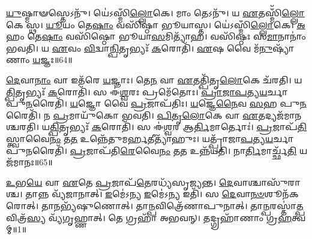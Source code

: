 \-\ul{𑌯𑍁}\-𑌷𑍍𑌮𑌾𑍟𑌸𑍍𑌤𑍇𑌽𑌨𑍁᳴।
𑌯𑍇॑𑌽𑌸𑍍𑌮𑌿𑌁\-\ul{𑌲𑍍𑌲𑍋}\-𑌕𑍇।
𑌮𑌾𑌂 𑌤𑍇𑌽𑌨𑍁᳴।
𑌯 \ul{𑌏}\-𑌤𑌸𑍍𑌮𑌿𑌁᳴\-\ul{𑌲𑍍𑌲𑍋}\-𑌕𑍇 𑌸𑍍𑌥।
\-\ul{𑌯𑍂}\-𑌯𑌂 𑌤𑍇\-\ul{𑌷𑌾𑌂} 𑌵𑌸𑌿᳴𑌷𑍍𑌠𑌾 𑌭𑍂𑌯𑌾𑌸𑍍𑌤।
𑌯𑍇॑𑌽𑌸𑍍𑌮𑌿𑌁\-\ul{𑌲𑍍𑌲𑍋}\-𑌕𑍇।
\-\ul{𑌅}\-𑌹𑌂 𑌤𑍇\-\ul{𑌷𑌾𑌂} 𑌵𑌸𑌿᳴𑌷𑍍𑌠𑍋 𑌭𑍂𑌯𑌾\-\ul{𑌸}\-𑌮𑌿𑌤𑍍𑌯𑌾᳴𑌹।
𑌵𑌸𑌿᳴𑌷𑍍𑌠𑌃 𑌸\-\ul{𑌮𑌾}\-𑌨𑌾𑌨𑌾𑌂॑ 𑌭𑌵𑌤𑌿।
𑌯 \ul{𑌏}\-𑌵𑌂 \ul{𑌵𑌿}\-𑌦𑍍𑌵𑌾\-\ul{𑌨𑍍𑌪𑌿}\-𑌤𑍃𑌭𑍍𑌯𑌃᳴ \ul{𑌕}\-𑌰𑍋𑌤𑌿᳴।
\-\ul{𑌏}\-𑌷 𑌵𑍈 𑌮᳴\-\ul{𑌨𑍁}\-𑌷𑍍𑌯𑌾᳴𑌣𑌾𑌂 \ul{𑌯}\-𑌜𑍍𑌞𑌃॥64॥

\-\ul{𑌦𑍇}\-𑌵𑌾\-\ul{𑌨𑌾𑌂} 𑌵𑌾 𑌇𑌤᳴𑌰𑍇 \ul{𑌯}\-𑌜𑍍𑌞𑌾𑌃।
𑌤𑍇\-\ul{𑌨} 𑌵𑌾 \ul{𑌏}\-𑌤𑌤𑍍𑌪𑌿᳴𑌤𑍃\-\ul{𑌲𑍋}\-𑌕𑍇 𑌚᳴𑌰𑌤𑌿।
𑌯\-\ul{𑌤𑍍𑌪𑌿}\-𑌤𑍃𑌭𑍍𑌯𑌃᳴ \ul{𑌕}\-𑌰𑍋𑌤𑌿᳴।
𑌸 𑌈॑\-\ul{𑌶𑍍𑌵}\-𑌰𑌃 𑌪𑍍𑌰𑌮𑍇᳴𑌤𑍋𑌃।
\-\ul{𑌪𑍍𑌰𑌾}\-\-\ul{𑌜𑌾}\-\-\ul{𑌪}\-𑌤𑍍𑌯\-\ul{𑌯}\-𑌰𑍍𑌚𑌾 𑌪𑍁\-\ul{𑌨}\-𑌰𑍈𑌤𑌿᳴।
\-\ul{𑌯}\-𑌜𑍍𑌞𑍋 𑌵𑍈 \ul{𑌪𑍍𑌰}\-𑌜𑌾\-𑌪᳴𑌤𑌿𑌃।
\-\ul{𑌯}\-𑌜𑍍𑌞𑍇\-\ul{𑌨𑍈}\-𑌵 \ul{𑌸}\-𑌹 𑌪𑍁\-\ul{𑌨}\-𑌰𑍈𑌤𑌿᳴।
𑌨 \ul{𑌪𑍍𑌰}\-𑌮𑌾𑌯𑍁᳴𑌕𑍋 𑌭𑌵𑌤𑌿।
\-\ul{𑌪𑌿}\-\-\ul{𑌤𑍃}\-\-\ul{𑌲𑍋}\-𑌕𑍇 𑌵𑌾 \ul{𑌏}\-𑌤𑌦𑍍𑌯𑌜᳴𑌮𑌾𑌨𑌶𑍍𑌚𑌰𑌤𑌿।
𑌯\-\ul{𑌤𑍍𑌪𑌿}\-𑌤𑍃𑌭𑍍𑌯𑌃᳴ \ul{𑌕}\-𑌰𑍋𑌤𑌿᳴।
𑌸 𑌈॑\-\ul{𑌶𑍍𑌵}\-𑌰 𑌆\-\ul{𑌰𑍍𑌤𑌿}\-𑌮𑌾𑌰𑍍𑌤𑍋𑌃॑।
\-\ul{𑌪𑍍𑌰}\-𑌜𑌾𑌪᳴\-\ul{𑌤𑌿}\-𑌸𑍍𑌤𑍍𑌵𑌾𑌵𑍈\-\ul{𑌨𑌂} 𑌤\-\ul{𑌤} 𑌉𑌨𑍍𑌨𑍇᳴𑌤𑍁𑌮𑌰𑍍\mbox{}\-\ul{𑌹}\-𑌤𑍀𑌤𑍍𑌯𑌾᳴𑌹𑍁𑌃।
𑌯𑌤𑍍𑌪𑍍𑌰𑌾᳴𑌜𑌾\-\ul{𑌪}\-𑌤𑍍𑌯\-\ul{𑌯}\-𑌰𑍍𑌚𑌾 𑌪𑍁\-\ul{𑌨}\-𑌰𑍈𑌤𑌿᳴।
\-\ul{𑌪𑍍𑌰}\-𑌜𑌾𑌪᳴𑌤𑌿\-\ul{𑌰𑍇}\-𑌵𑍈\-\ul{𑌨𑌂} 𑌤\-\ul{𑌤} 𑌉𑌨𑍍𑌨᳴𑌯𑌤𑌿।
𑌨𑌾\-\ul{𑌰𑍍𑌤𑌿}\-𑌮𑌾𑌰𑍍𑌚𑍍𑌛᳴\-\ul{𑌤𑌿} 𑌯𑌜᳴𑌮𑌾𑌨𑌃॥65॥\anuvakamend[𑌇𑌤𑍍𑌯᳴𑌶𑍍𑌞𑍁𑌤𑍇 𑌪𑌦𑍍𑌯𑌨𑍍𑌤𑍇 𑌪𑌦𑍍𑌯\-\ul{𑌨𑍍𑌤𑍇} 𑌷𑌡𑍍𑌵𑌾 \ul{𑌋}\-𑌤𑌵𑍋᳴ 𑌵\-\ul{𑌰𑍍𑌤}\-𑌤𑍇\-𑌽𑌹᳴𑌵𑌿𑌃 \ul{𑌸𑍍𑌯𑌾}\-𑌨𑍍𑌨𑍇𑌦𑍀᳴\-\ul{𑌯𑌃} 𑌸𑍍𑌥 \ul{𑌯}\-𑌜𑍍𑌞𑍋 𑌯𑌜᳴𑌮𑌾𑌨𑌶𑍍𑌚𑌰\-\ul{𑌤𑌿} 𑌯\-\ul{𑌤𑍍𑌪𑌿}\-𑌤𑍃𑌭𑍍𑌯𑌃᳴ \ul{𑌕}\-𑌰𑍋\-\ul{𑌤𑌿} 𑌪𑌞𑍍𑌚᳴ 𑌚]




\clearpage
{}
\setcounter{anuvakam}{0}

\-\ul{𑌉}\-𑌭\-\ul{𑌯𑍇} 𑌵𑌾 \ul{𑌏}\-𑌤𑍇 \ul{𑌪𑍍𑌰}\-𑌜𑌾𑌪᳴\-\ul{𑌤𑍇}\-𑌰𑌧𑍍𑌯᳴𑌸𑍃𑌜𑍍𑌯𑌨𑍍𑌤।
\-\ul{𑌦𑍇}\-𑌵𑌾𑌶𑍍𑌚𑌾𑌸𑍁᳴𑌰𑌾𑌶𑍍𑌚।
𑌤𑌾𑌨𑍍𑌨 𑌵𑍍𑌯᳴𑌜𑌾𑌨𑌾𑌤𑍍।
\-\ul{𑌇}\-𑌮𑍇॑𑌽𑌨𑍍𑌯 \ul{𑌇}\-𑌮𑍇॑𑌽𑌨𑍍𑌯 𑌇𑌤𑌿᳴।
𑌸 \ul{𑌦𑍇}\-𑌵𑌾\-\ul{𑌨}\-\-\ul{𑍞}\-𑌶𑍂𑌨᳴𑌕𑌰𑍋𑌤𑍍।
𑌤𑌾\-\ul{𑌨}\-𑌭𑍍𑌯᳴𑌷𑍁𑌣𑍋𑌤𑍍।
𑌤𑌾\-\ul{𑌨𑍍𑌪}\-𑌵𑌿𑌤𑍍𑌰𑍇᳴𑌣𑌾𑌪𑍁𑌨𑌾𑌤𑍍।
𑌤𑌾\-\ul{𑌨𑍍𑌪}\-𑌰𑌸𑍍𑌤𑌾॑\-\ul{𑌤𑍍𑌪}\-𑌵𑌿𑌤𑍍𑌰᳴\-\ul{𑌸𑍍𑌯} 𑌵𑍍𑌯᳴𑌗𑍃𑌹𑍍𑌣𑌾𑌤𑍍।
𑌤𑍇 𑌗𑍍𑌰𑌹𑌾᳴ 𑌅𑌭𑌵𑌨𑍍।
𑌤𑌦𑍍𑌗𑍍𑌰𑌹𑌾᳴𑌣𑌾𑌂 𑌗𑍍𑌰\-\ul{𑌹}\-𑌤𑍍𑌵𑌮𑍍॥1॥


